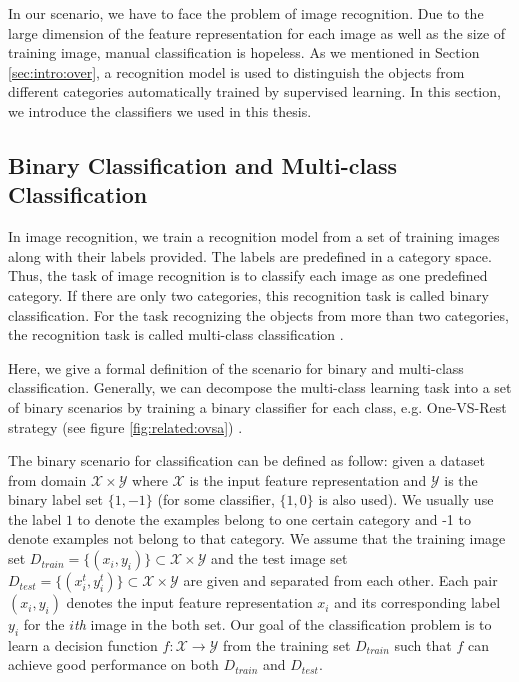 
In our scenario, we have to face the problem of image recognition. Due to the large dimension of the feature representation for each image as well as the size of training image, manual classification is hopeless. As we mentioned in Section \ref{sec:intro:over}, a recognition model is used to distinguish the objects from different categories automatically trained by supervised learning. In this section, we introduce the classifiers we used in this thesis.

\subsection{Binary Classification and Multi-class Classification}

In image recognition, we train a recognition model from a set of training images along with their labels provided. The labels are predefined in a category space. Thus, the task of image recognition is to classify each image as one predefined category. If there are only two categories, this recognition task is called binary classification. For the task recognizing the objects from more than two categories, the recognition task is called multi-class classification \cite{aytar2011tabula} \cite{krizhevsky2012imagenet}.  

Here, we give a formal definition of the scenario for binary and multi-class classification. Generally, we can decompose the multi-class learning task into a set of binary scenarios by training a binary classifier for each class, e.g. One-VS-Rest strategy (see figure \ref{fig:related:ovsa})\cite{rifkin2004defense} \cite{tsoumakas2006multi}.

The binary scenario for classification can be defined as follow: given a dataset from domain $\mathcal{X} \times \mathcal{Y}$ where $\mathcal{X}$ is the input feature representation and $\mathcal{Y}$ is the binary label set $\{1,-1\}$ (for some classifier, $\{1,0\}$ is also used). We usually use the label $1$ to denote the examples belong to one certain category and -1 to denote examples not belong to that category. 
We assume that the training image set $D_{train}=\{(x_i,y_i)\} \subset \mathcal{X} \times \mathcal{Y}$ and the test image set $D_{test}=\{(x^t_i,y^t_i)\}\subset \mathcal{X} \times \mathcal{Y}$ are given and separated from each other. Each pair $(x_i,y_i)$ denotes the input feature representation $x_i$ and its corresponding label $y_i$ for the $i$\textit{th} image in the both set. Our goal of the classification problem is to learn a decision function $f:\mathcal{X} \rightarrow \mathcal{Y}$ from the training set $D_{train}$ such that $f$ can achieve good performance on both $D_{train}$ and $D_{test}$. 


